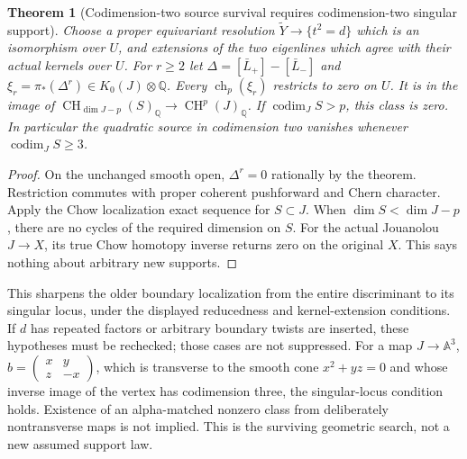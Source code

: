 \documentclass[11pt]{article}
\newtheorem{theorem}{Theorem}[section]
\newcommand{\CH}{\operatorname{CH}}
\newcommand{\ch}{\operatorname{ch}}
\begin{document}
\begin{theorem}[Codimension-two source survival requires codimension-two singular support]
Choose a proper equivariant resolution $\widetilde Y\to\{t^2=d\}$ which is
an isomorphism over $U$, and extensions of the two eigenlines which agree
with their actual kernels over $U$. For $r\ge2$ let
$\Delta=[\bar L_+]-[\bar L_-]$ and
$\xi_r=\pi_*(\Delta^r)\in K_0(J)\otimes\mathbb Q$.
Every $\ch_p(\xi_r)$ restricts to zero on $U$. It is in the image of
$\CH_{\dim J-p}(S)_\mathbb Q\to\CH^p(J)_\mathbb Q$.
If $\operatorname{codim}_J S>p$, this class is zero.
In particular the quadratic source in codimension two vanishes whenever
$\operatorname{codim}_J S\ge3$.
\end{theorem}
\begin{proof}
On the unchanged smooth open, $\Delta^r=0$ rationally by the theorem.
Restriction commutes with proper coherent pushforward and Chern character.
Apply the Chow localization exact sequence for $S\subset J$.
When $\dim S<\dim J-p$, there are no cycles of the required dimension on $S$.
For the actual Jouanolou $J\to X$, its true Chow homotopy inverse returns
zero on the original $X$. This says nothing about arbitrary new supports.
\end{proof}
This sharpens the older boundary localization from the entire discriminant
to its singular locus, under the displayed reducedness and kernel-extension
conditions. If $d$ has repeated factors or arbitrary boundary twists are
inserted, these hypotheses must be rechecked; those cases are not suppressed.
For a map $J\to\mathbb A^3$, $b=\left(\begin{smallmatrix}x&y\\z&-x\end{smallmatrix}\right)$,
which is transverse to the smooth cone $x^2+yz=0$ and whose inverse image of
the vertex has codimension three, the singular-locus condition holds. Existence
of an alpha-matched nonzero class from deliberately nontransverse maps is not
implied. This is the surviving geometric search, not a new assumed support law.
\end{document}
